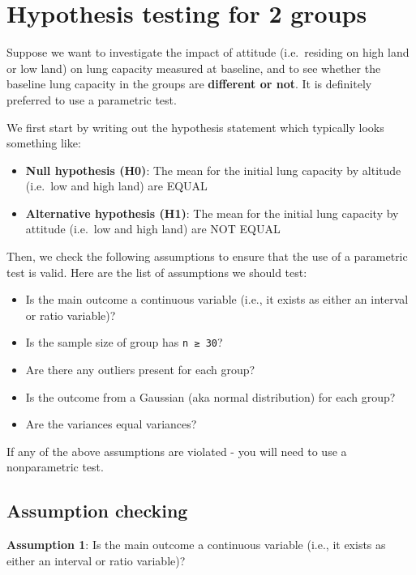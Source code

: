\documentclass[
]{book}
\begin{document}
\hypertarget{hypothesis-testing-for-2-groups}{%
\section{Hypothesis testing for 2 groups}\label{hypothesis-testing-for-2-groups}}

Suppose we want to investigate the impact of attitude (i.e.~residing on high land or low land) on lung capacity measured at baseline, and to see whether the baseline lung capacity in the groups are \textbf{different or not}. It is definitely preferred to use a parametric test.

We first start by writing out the hypothesis statement which typically looks something like:

\begin{itemize}
\item
  \textbf{Null hypothesis (H0)}: The mean for the initial lung capacity by altitude (i.e.~low and high land) are EQUAL
\item
  \textbf{Alternative hypothesis (H1)}: The mean for the initial lung capacity by attitude (i.e.~low and high land) are NOT EQUAL
\end{itemize}

Then, we check the following assumptions to ensure that the use of a parametric test is valid. Here are the list of assumptions we should test:

\begin{itemize}
\item
  Is the main outcome a continuous variable (i.e., it exists as either an interval or ratio variable)?
\item
  Is the sample size of group has \texttt{n\ ≥\ 30}?
\item
  Are there any outliers present for each group?
\item
  Is the outcome from a Gaussian (aka normal distribution) for each group?
\item
  Are the variances equal variances?
\end{itemize}

If any of the above assumptions are violated - you will need to use a nonparametric test.

\hypertarget{assumption-checking}{%
\subsection{Assumption checking}\label{assumption-checking}}

\textbf{Assumption 1}: Is the main outcome a continuous variable (i.e., it exists as either an interval or ratio variable)?
\end{document}
